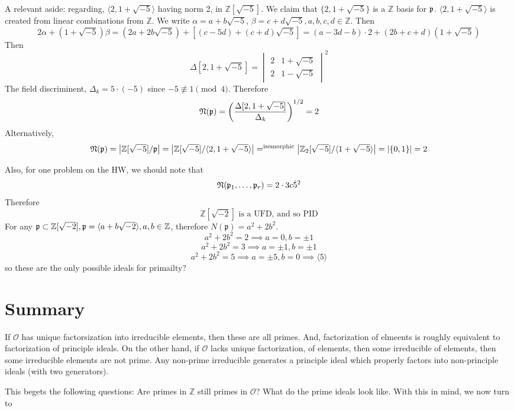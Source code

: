 \documentclass{article}
\begin{document}
A relevant aside: regarding, $\langle 2, 1+\sqrt{-5}\rangle$ having norm 2, in
$\mathbb{Z}[\sqrt{-5}]$. We claim that $\{2, 1+\sqrt{-5}\}$ is a $\mathbb{Z}$
basis for $\frak{p}$. $\langle 2, 1+\sqrt{-5}\rangle$ is created from linear
combinations from $\mathbb{Z}$. We write $\alpha = a + b \sqrt{-5}$, $\beta = c
+ d\sqrt{-5}, a,b,c,d \in \mathbb{Z}$. Then 
\[ 2 \alpha + (1 + \sqrt{-5})\beta = (2a + 2b \sqrt{-5})+[(c-5d) +
(c+d)\sqrt{-5}] = (a-3d-b)\cdot 2 + (2b+c+d)(1+\sqrt{-5}) \]
Then
\[ \Delta[2, 1+\sqrt{-5}] = \begin{vmatrix} 2 & 1 + \sqrt{-5} \\
2 & 1 - \sqrt{-5} \end{vmatrix}^2 \]
The field discriminent, $\Delta_k = 5\cdot (-5)$ since $-5 \not\equiv 1
\pmod{4}$. Therefore
\[ \frak{N}(\frak{p}) = \left(\frac{\Delta[2,
1+\sqrt{-5}]}{\Delta_k}\right)^{1/2} = 2 \]
Alternatively, 
\[ \frak{N}(\frak{p}) = \left | \mathbb{Z}[\sqrt{-5}]/\frak{p}\right| = 
\left| \mathbb{Z}[\sqrt{-5}] / \langle2, 1 + \sqrt{-5}\rangle\right|
=^{\text{isomorphic}}
\left| \mathbb{Z}_2[\sqrt{-5}]/\langle 1 + \sqrt{-5} \rangle\right| = | \{0,1\}
| = 2 \]


Also, for one problem on the HW, we should note that
\[ \mathfrak{N}(\frak{p}_1,\ldots, \frak{p}_r) = 2 \cdot 3 c\dot 5^2 \]
Therefore
\[ \mathbb{Z}[\sqrt{-2}] \text{ is a UFD, and so PID} \]
For any $\frak{p} \subset \mathbb{Z}[\sqrt{-2}], \frak{p} = \langle a + b
\sqrt{-2} \rangle, a,b \in \mathbb{Z}$, therefore $N(\mathfrak{p}) = a^2 +2b^2$.
\[ a^2+2b^2 = 2 \implies a=0,b=\pm 1 \]
\[ a^2+2b^2 = 3 \implies a=\pm 1,b=\pm 1 \]
\[ a^2+2b^2 = 5 \implies a=\pm 5,b= 0 \implies \langle 5 \rangle \]
so these are the only possible ideals for primailty?

\section{Summary}
If $\mathcal{O}$ has unique factorsization into irreducible elements, then these
are all primes. And, factorization of elmeents is roughly equivalent to factorization of
principle ideals. On the other hand, if $\mathcal{O}$ lacks unique factorization, of elements,
then some irreducible  of elements, then some irreducible elements are not
prime. Any non-prime irreducible generates a principle ideal which properly
factors into non-principle ideals (with two generators). 

This begets the following questions: Are primes in $\mathbb{Z}$ still primes in
$\mathcal{O}$? What do the prime ideals look like. With this in mind, we now
turn to
\end{document}
